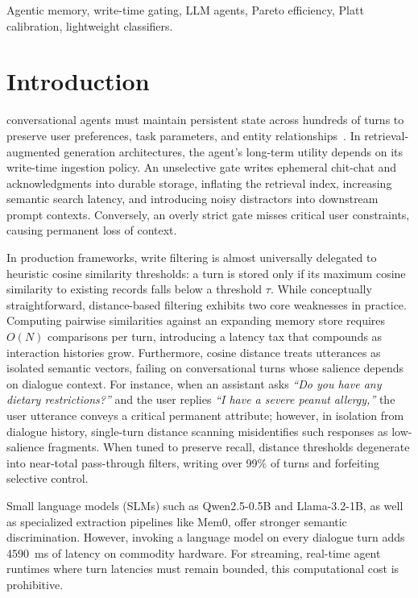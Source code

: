 \documentclass[journal]{IEEEtran}
\begin{document}
\begin{IEEEkeywords}
Agentic memory, write-time gating, LLM agents, Pareto efficiency, Platt calibration, lightweight classifiers.
\end{IEEEkeywords}

\section{Introduction}
 conversational agents must maintain persistent state across hundreds of turns to preserve user preferences, task parameters, and entity relationships~\cite{packer2023memgpt,chaudhary2024mem0,zhang2024amem,park2023generative}. In retrieval-augmented generation architectures, the agent's long-term utility depends on its write-time ingestion policy. An unselective gate writes ephemeral chit-chat and acknowledgments into durable storage, inflating the retrieval index, increasing semantic search latency, and introducing noisy distractors into downstream prompt contexts. Conversely, an overly strict gate misses critical user constraints, causing permanent loss of context.

In production frameworks, write filtering is almost universally delegated to heuristic cosine similarity thresholds: a turn is stored only if its maximum cosine similarity to existing records falls below a threshold $\tau$. While conceptually straightforward, distance-based filtering exhibits two core weaknesses in practice. Computing pairwise similarities against an expanding memory store requires $O(N)$ comparisons per turn, introducing a latency tax that compounds as interaction histories grow. Furthermore, cosine distance treats utterances as isolated semantic vectors, failing on conversational turns whose salience depends on dialogue context. For instance, when an assistant asks \textit{``Do you have any dietary restrictions?''} and the user replies \textit{``I have a severe peanut allergy,''} the user utterance conveys a critical permanent attribute; however, in isolation from dialogue history, single-turn distance scanning misidentifies such responses as low-salience fragments. When tuned to preserve recall, distance thresholds degenerate into near-total pass-through filters, writing over 99\% of turns and forfeiting selective control.

Small language models (SLMs) such as Qwen2.5-0.5B and Llama-3.2-1B, as well as specialized extraction pipelines like Mem0, offer stronger semantic discrimination. However, invoking a language model on every dialogue turn adds 45\text{--}90~ms of latency on commodity hardware. For streaming, real-time agent runtimes where turn latencies must remain bounded, this computational cost is prohibitive.
\end{document}
